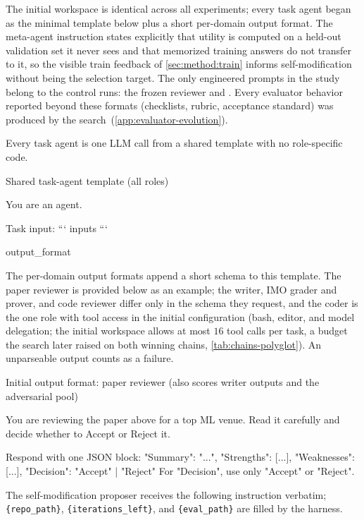 The initial workspace is identical across all experiments; every task agent began as the minimal template below plus a short per-domain output format. The meta-agent instruction states explicitly that utility is computed on a held-out validation set it never sees and that memorized training answers do not transfer to it, so the visible train feedback of \cref{sec:method:train} informs self-modification without being the selection target. The only engineered prompts in the study belong to the control runs: the frozen \sakana reviewer and \proofautograder. Every evaluator behavior reported beyond these formats (checklists, rubric, acceptance standard) was produced by the search~(\cref{app:evaluator-evolution}).

Every task agent is one LLM call from a shared template with no role-specific code.

\begin{promptbox}{Shared task-agent template (all roles)}
\begin{PromptVerb}
You are an agent.

Task input:
```
{inputs}
```

{output_format}
\end{PromptVerb}
\end{promptbox}

The per-domain output formats append a short schema to this template. The paper reviewer is provided below as an example; the writer, IMO grader and prover, and code reviewer differ only in the schema they request, and the coder is the one role with tool access in the initial configuration (bash, editor, and model delegation; the initial workspace allows at most $16$ tool calls per task, a budget the search later raised on both winning chains, \cref{tab:chains-polyglot}). An unparseable output counts as a failure.

\begin{promptbox}{Initial output format: paper reviewer (also scores writer outputs and the adversarial pool)}
\begin{PromptVerb}
You are reviewing the paper above for a top ML venue. Read it carefully
and decide whether to Accept or Reject it.

Respond with one JSON block:
{
  "Summary": "...", "Strengths": [...], "Weaknesses": [...],
  "Decision": "Accept" | "Reject"
}
For "Decision", use only "Accept" or "Reject".
\end{PromptVerb}
\end{promptbox}


The self-modification proposer receives the following instruction verbatim; \texttt{\{repo\_path\}}, \texttt{\{iterations\_left\}}, and \texttt{\{eval\_path\}} are filled by the harness.

